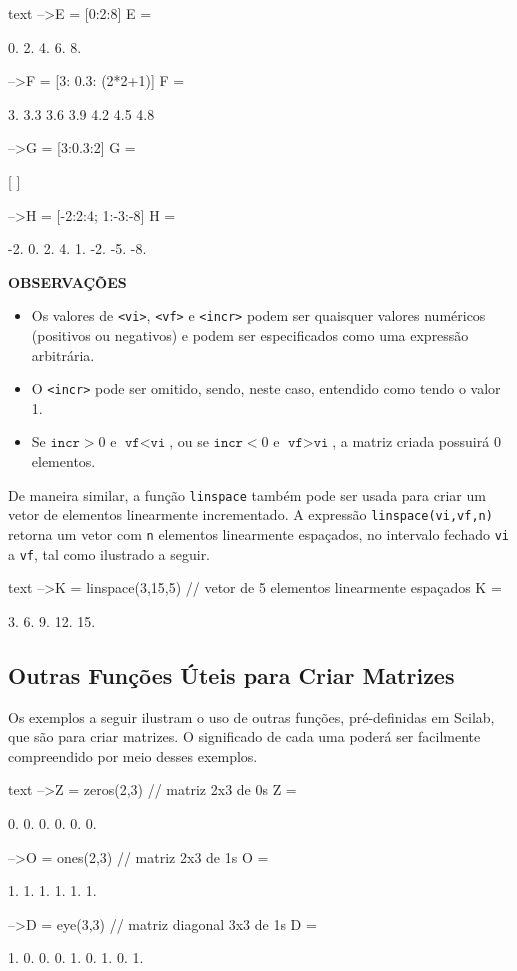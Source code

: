 \documentclass[11pt,fleqn]{practice}
\begin{document}
\begin{lst}{text}
-->E = [0:2:8]
 E =
 
     0.     2.    4.    6.    8.
     
-->F = [3: 0.3: (2*2+1)]
 F  =
 
      3.     3.3    3.6    3.9    4.2    4.5    4.8
      
-->G = [3:0.3:2]
 G  =
 
     [ ]

-->H = [-2:2:4; 1:-3:-8]
 H  =
 
     -2.     0.     2.    4.  
       1.   -2.   -5.  -8.
\end{lst}


\textbf{OBSERVAÇÕES}
\begin{itemize}
\item Os valores de  \texttt{<vi>},  \texttt{<vf>} e \texttt{<incr>} podem ser quaisquer valores numéricos (positivos ou negativos) e podem ser especificados como uma expressão arbitrária. 
\item O \texttt{<incr>}  pode ser omitido, sendo, neste caso, entendido como tendo o valor 1.
\item Se $\texttt{incr} > 0$ e $\texttt{vf} < \texttt{vi}$, ou se $\texttt{incr} < 0$ e $\texttt{vf} > \texttt{vi}$, a matriz criada possuirá 0 elementos. 
\end{itemize}

De maneira similar, a função \texttt{linspace} também pode ser usada para criar um vetor de elementos linearmente incrementado. A expressão \texttt{linspace(vi,vf,n)} retorna um vetor com \texttt{n} elementos linearmente espaçados, no intervalo fechado \texttt{vi} a \texttt{vf}, tal como ilustrado  
a seguir.

\begin{lst}{text}
-->K = linspace(3,15,5)  // vetor de 5 elementos linearmente espaçados
 K =
 
     3.     6.    9.    12.    15.
 \end{lst}

\subsection{Outras Funções Úteis para Criar Matrizes}

Os exemplos a seguir ilustram o uso de outras funções, pré-definidas em Scilab, que são para criar matrizes. O significado de cada uma poderá ser facilmente compreendido por meio desses exemplos.

\begin{lst}{text}
-->Z = zeros(2,3)  //  matriz 2x3 de 0s
 Z =
 
     0.     0.    0.
     0.     0.    0.

-->O = ones(2,3)  //  matriz 2x3 de 1s
 O =
 
     1.     1.    1.
     1.     1.    1.

-->D = eye(3,3)  //  matriz diagonal 3x3 de 1s
 D =
 
     1.     0.    0.
     0.     1.    0.
     1.     0.    1.
 \end{lst}
\end{document}
